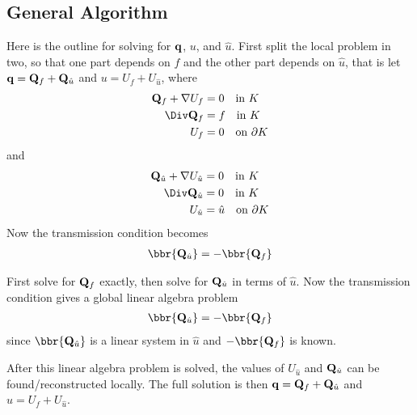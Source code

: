 \documentclass[oneside]{article}
\begin{document}
  \subsection{General Algorithm}
    Here is the outline for solving for \(\mathbf{q}\), \(u\), and \(\hat{u}\).
    First split the local problem in two, so that one part depends on \(f\) and the
    other part depends on \(\hat{u}\), that is let
    \(\mathbf{q} = \mathbf{Q}_f + \mathbf{Q}_{\hat{u}}\) and \(u = U_f + U_{\hat{u}}\), where
    \begin{align*}
      \v{Q}_f + \nabla U_f &= 0 \quad \text{in } K \\
      \Div \v{Q}_f &= f \quad \text{in } K \\
      U_f &= 0 \quad \text{on } \partial K
    \end{align*}
    and
    \begin{align*}
      \v{Q}_{\hat{u}}+ \nabla U_{\hat{u}} &= 0 \quad \text{in } K \\
      \Div \v{Q}_{\hat{u}} &= 0 \quad \text{in } K \\
      U_{\hat{u}} &= \hat{u} \quad \text{on } \partial K
    \end{align*}
    Now the transmission condition becomes
    \begin{align*}
      \bbr{\v{Q}_{\hat{u}}} = -\bbr{\v{Q}_f}
    \end{align*}

    First solve for \(\mathbf{Q}_f\) exactly, then solve for \(\mathbf{Q}_{\hat{u}}\) in terms
    of \(\hat{u}\).
    Now the transmission condition gives a global linear algebra problem
    \begin{align*}
      \bbr{\v{Q}_{\hat{u}}} = -\bbr{\v{Q}_f}
    \end{align*}
    since \(\bbr{\v{Q}_{\hat{u}}}\) is a linear system in \(\hat{u}\) and
    \(-\bbr{\v{Q}_f}\) is known.

    After this linear algebra problem is solved, the values of \(U_{\hat{u}}\) and
    \(\mathbf{Q}_{\hat{u}}\) can be found/reconstructed locally.
    The full solution is then \(\mathbf{q} = \mathbf{Q}_f + \mathbf{Q}_{\hat{u}}\) and
    \(u = U_f + U_{\hat{u}}\).
\end{document}
